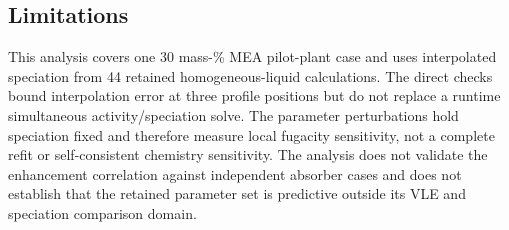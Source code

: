 \subsection*{Limitations}

This analysis covers one 30 mass-\% MEA pilot-plant case and uses interpolated
speciation from 44 retained homogeneous-liquid calculations.  The direct
checks bound interpolation error at three profile positions but do not replace
a runtime simultaneous activity/speciation solve.  The parameter perturbations
hold speciation fixed and therefore measure local fugacity sensitivity, not a
complete refit or self-consistent chemistry sensitivity.  The analysis does
not validate the enhancement correlation against independent absorber cases
and does not establish that the retained parameter set is predictive outside
its VLE and speciation comparison domain.

\FloatBarrier
